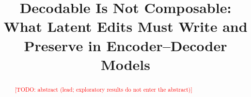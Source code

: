 \documentclass[11pt]{article}
\title{Decodable Is Not Composable: What Latent Edits Must Write and Preserve in Encoder--Decoder Models}
\author{\TODO{authors}}
\date{}
\newcommand{\TODO}[1]{\textcolor{red}{[TODO: #1]}}
\begin{document}
\maketitle
\begin{abstract}
\TODO{abstract (lead; exploratory results do not enter the abstract)}
\end{abstract}














\appendix







\end{document}
